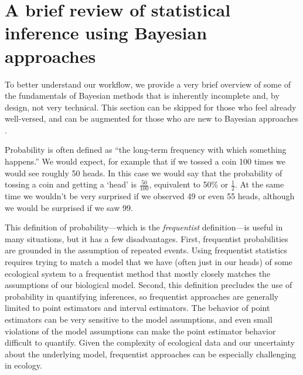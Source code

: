 \documentclass[11pt]{article}
\begin{document}
\section*{A brief review of statistical inference using Bayesian approaches}


To better understand our workflow, we provide a very brief overview of some of the fundamentals of Bayesian methods that is inherently incomplete and, by design, not very technical. This section can be skipped for those who feel already well-versed, and can be augmented for those who are new to Bayesian approaches \citep[for example,][]{statrethink,BDA,regotherstories}.

Probability is often defined as ``the long-term frequency with which something happens.'' We would expect, for example that if we tossed a coin 100 times we would see roughly 50 heads. In this case we would say that the probability of tossing a coin and getting a `head' is $\frac{50}{100}$, equivalent to 50\% or $\frac{1}{2}$. At the same time we wouldn't be very surprised if we observed 49 or even 55 heads, although we would be surprised if we saw 99.

This definition of probability---which is the \emph{frequentist} definition---is useful in many situations, but it has a few disadvantages. First, frequentist probabilities are grounded in the assumption of repeated events. Using frequentist statistics requires trying to match a model that we have (often just in our heads) of some ecological system to a frequentist method that mostly closely matches the assumptions of our biological model. Second, this definition precludes the use of probability in quantifying inferences, so frequentist approaches are generally limited to point estimators and interval estimators.  The behavior of point estimators can be very sensitive to the model assumptions, and even small violations of the model assumptions can make the point estimator behavior difficult to quantify. Given the complexity of ecological data and our uncertainty about the underlying model, frequentist approaches can be especially challenging in ecology. 
\end{document}
